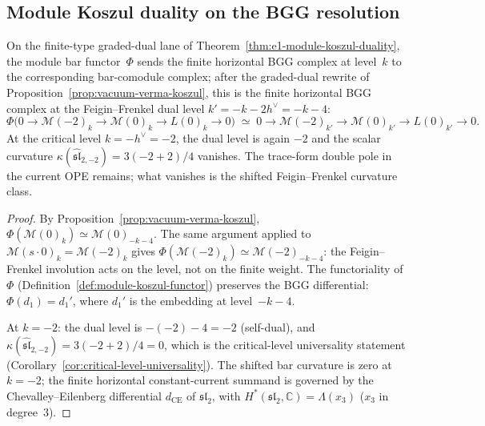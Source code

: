 \subsection{Module Koszul duality on the BGG resolution}

\begin{corollary}
\label{cor:bgg-koszul-involution}

On the finite-type graded-dual lane of
Theorem~\textup{\ref{thm:e1-module-koszul-duality}}, the module
bar functor~$\Phi$ sends the finite horizontal BGG complex at
level~$k$ to the corresponding bar-comodule complex; after the
graded-dual rewrite of Proposition~\ref{prop:vacuum-verma-koszul},
this is the finite horizontal BGG complex at the
Feigin--Frenkel dual level $k' = -k - 2h^\vee = -k - 4$:
\begin{equation}\label{eq:bgg-koszul-involution}
\Phi\bigl(0 \to \mathcal{M}(-2)_k \to
\mathcal{M}(0)_k \to L(0)_k \to 0\bigr)
\;\simeq\;
0 \to \mathcal{M}(-2)_{k'} \to
\mathcal{M}(0)_{k'} \to L(0)_{k'} \to 0.
\end{equation}
At the critical level $k = -h^\vee = -2$, the dual level is again
$-2$ and the scalar curvature
$\kappa(\widehat{\mathfrak{sl}}_{2,-2})=3(-2+2)/4$ vanishes. The
trace-form double pole in the current OPE remains; what vanishes is
the shifted Feigin--Frenkel curvature class.
\end{corollary}

\begin{proof}
By Proposition~\ref{prop:vacuum-verma-koszul},
$\Phi(\mathcal{M}(0)_k) \simeq \mathcal{M}(0)_{-k-4}$.
The same argument applied to
$\mathcal{M}(s \cdot 0)_k = \mathcal{M}(-2)_k$ gives
$\Phi(\mathcal{M}(-2)_k) \simeq \mathcal{M}(-2)_{-k-4}$:
the Feigin--Frenkel involution
acts on the level, not on the finite weight.
 The functoriality of~$\Phi$
 \textup{(}Definition~\textup{\ref{def:module-koszul-functor}}\textup{)}
 preserves the BGG differential:
$\Phi(d_1) = d_1'$, where $d_1'$ is the embedding at
level~$-k-4$.

At $k = -2$: the dual level is $-(-2) - 4 = -2$
(self-dual), and $\kappa(\widehat{\mathfrak{sl}}_{2,-2}) = 3(-2+2)/4 = 0$,
which is the critical-level universality statement
(Corollary~\ref{cor:critical-level-universality}).
The shifted bar curvature is zero at $k=-2$; the finite horizontal
constant-current summand is governed by the Chevalley--Eilenberg
differential $d_{\mathrm{CE}}$ of $\mathfrak{sl}_2$, with
$H^*(\mathfrak{sl}_2,\mathbb{C})=\Lambda(x_3)$
($x_3$ in degree~$3$).
\end{proof}


